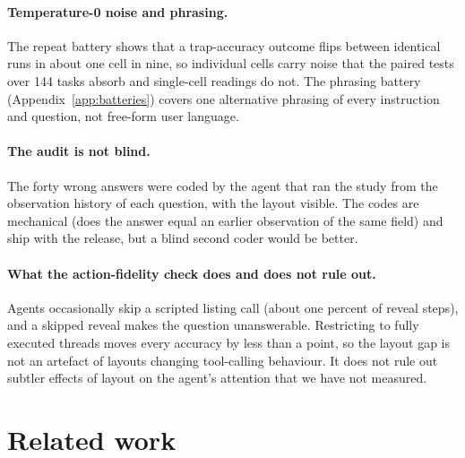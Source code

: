 \paragraph{Temperature-0 noise and phrasing.} The repeat battery shows that a trap-accuracy outcome flips between identical runs in about one cell in nine, so individual cells carry noise that the paired tests over 144 tasks absorb and single-cell readings do not. The phrasing battery (Appendix~\ref{app:batteries}) covers one alternative phrasing of every instruction and question, not free-form user language.

\paragraph{The audit is not blind.} The forty wrong answers were coded by the agent that ran the study from the observation history of each question, with the layout visible. The codes are mechanical (does the answer equal an earlier observation of the same field) and ship with the release, but a blind second coder would be better.

\paragraph{What the action-fidelity check does and does not rule out.} Agents occasionally skip a scripted listing call (about one percent of reveal steps), and a skipped reveal makes the question unanswerable. Restricting to fully executed threads moves every accuracy by less than a point, so the layout gap is not an artefact of layouts changing tool-calling behaviour. It does not rule out subtler effects of layout on the agent's attention that we have not measured.

\section{Related work}
\label{sec:related}

